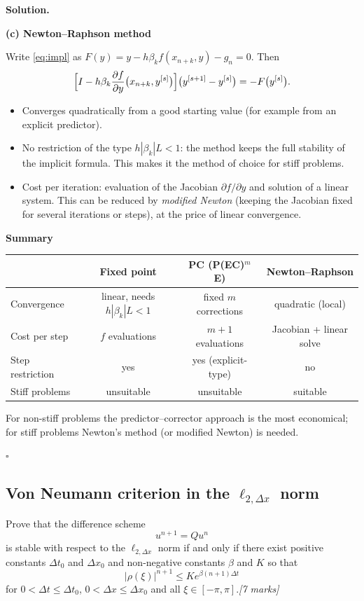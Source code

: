 \documentclass[11pt,a4paper]{article}
\newenvironment{solution}
  {\par\noindent\textbf{Solution.}\par\nobreak}
  {\par\hfill\(\square\)\par}
\newcommand{\step}[1]{\par\addvspace{0.5em}\noindent\textbf{#1}\par\nobreak}
\newcommand{\mk}[1]{\hfill\textit{[#1 marks]}}
\begin{document}
\begin{solution}
\step{(c) Newton--Raphson method}
Write \eqref{eq:impl} as \(F(y)=y-h\beta_kf(x_{n+k},y)-g_n=0\).  Then
\[
  \Bigl[I-h\beta_k\frac{\partial f}{\partial y}\bigl(x_{n+k},y^{[s]}\bigr)\Bigr]
  \bigl(y^{[s+1]}-y^{[s]}\bigr)=-F\bigl(y^{[s]}\bigr).
\]
\begin{itemize}
  \item Converges quadratically from a good starting value (for example
    from an explicit predictor).
  \item No restriction of the type \(h|\beta_k|L<1\): the method keeps
    the full stability of the implicit formula.  This makes it the
    method of choice for stiff problems.
  \item Cost per iteration: evaluation of the Jacobian
    \(\partial f/\partial y\) and solution of a linear system.  This can
    be reduced by \emph{modified Newton} (keeping the Jacobian fixed for
    several iterations or steps), at the price of linear convergence.
\end{itemize}

\step{Summary}
\begin{center}
\renewcommand{\arraystretch}{1.3}
\begin{tabular}{@{}lccc@{}}
\toprule
 & Fixed point & PC (P(EC)\(^m\)E) & Newton--Raphson\\
\midrule
Convergence & linear, needs \(h|\beta_k|L<1\) & fixed \(m\) corrections & quadratic (local)\\
Cost per step & \(f\) evaluations & \(m+1\) evaluations & Jacobian + linear solve\\
Step restriction & yes & yes (explicit-type) & no\\
Stiff problems & unsuitable & unsuitable & suitable\\
\bottomrule
\end{tabular}
\end{center}
For non-stiff problems the predictor--corrector approach is the most
economical; for stiff problems Newton's method (or modified Newton) is
needed.
\end{solution}

\subsection{Von Neumann criterion in the \(\ell_{2,\Delta x}\) norm}

\begin{qbox}
Prove that the difference scheme
\[
  u^{n+1}=Qu^n
\]
is stable with respect to the \(\ell_{2,\Delta x}\) norm if and only if
there exist positive constants \(\Delta t_0\) and \(\Delta x_0\) and
non-negative constants \(\beta\) and \(K\) so that
\[
  |\rho(\xi)|^{n+1}\le Ke^{\beta(n+1)\Delta t}
\]
for \(0<\Delta t\le\Delta t_0\), \(0<\Delta x\le\Delta x_0\) and all
\(\xi\in[-\pi,\pi]\).\mk{7}
\end{qbox}
\end{document}
